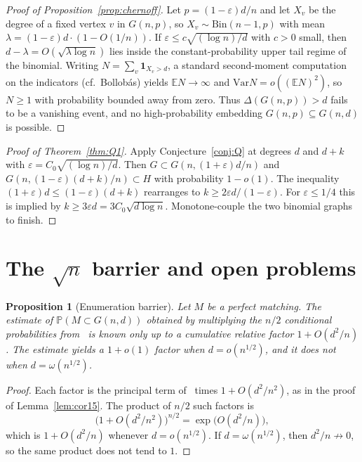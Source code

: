 \documentclass[11pt]{article}
\newtheorem{proposition}[theorem]{Proposition}
\newcommand{\Gnd}{G(n,d)}
\newcommand{\EE}{\mathbb{E}}
\newcommand{\PP}{\mathbb{P}}
\newcommand{\Var}{\mathrm{Var}}
\begin{document}
\begin{proof}[Proof of Proposition~\ref{prop:chernoff}]
Let \(p=(1-\varepsilon)d/n\) and let \(X_v\) be the degree of a fixed vertex \(v\) in
\(G(n,p)\), so \(X_v\sim\mathrm{Bin}(n-1,p)\) with mean
\(\lambda=(1-\varepsilon)d\cdot(1-O(1/n))\).
If \(\varepsilon\le c\sqrt{(\log n)/d}\) with \(c>0\) small, then
\(d-\lambda=O(\sqrt{\lambda\log n})\) lies inside the constant-probability upper
tail regime of the binomial.
Writing \(N=\sum_v\mathbf{1}_{X_v>d}\), a standard second-moment computation on the
indicators (cf.\ Bollob\'as) yields \(\EE N\to\infty\) and
\(\Var N=o((\EE N)^2)\), so \(N\ge 1\) with probability bounded away from zero.
Thus \(\Delta(G(n,p))>d\) fails to be a vanishing event, and no high-probability
embedding \(G(n,p)\subseteq\Gnd\) is possible.
\end{proof}

\begin{proof}[Proof of Theorem~\ref{thm:Q1}]
Apply Conjecture~\ref{conj:Q} at degrees \(d\) and \(d+k\) with
\(\varepsilon=C_0\sqrt{(\log n)/d}\).
Then \(G\subset G(n,(1+\varepsilon)d/n)\) and
\(G(n,(1-\varepsilon)(d+k)/n)\subset H\) with probability \(1-o(1)\).
The inequality \((1+\varepsilon)d\le(1-\varepsilon)(d+k)\) rearranges to
\(k\ge 2\varepsilon d/(1-\varepsilon)\).
For \(\varepsilon\le 1/4\) this is implied by \(k\ge 3\varepsilon d=3C_0\sqrt{d\log n}\).
Monotone-couple the two binomial graphs to finish.
\end{proof}

\section{The \texorpdfstring{\(\sqrt{n}\)}{sqrt(n)} barrier and open problems}
\label{sec:open}

\begin{proposition}[Enumeration barrier]
\label{prop:barrier}
Let \(M\) be a perfect matching. The estimate of \(\PP(M\subset\Gnd)\) obtained by
multiplying the \(n/2\) conditional probabilities from~\cite[Theorem~6]{Gao20} is
known only up to a cumulative relative factor \(1+O(d^2/n)\). The estimate yields a
\(1+o(1)\) factor when \(d=o(n^{1/2})\), and it does not when \(d=\omega(n^{1/2})\).
\end{proposition}

\begin{proof}
Each factor is the principal term of~\cite[Theorem~6]{Gao20} times \(1+O(d^2/n^2)\),
as in the proof of Lemma~\ref{lem:cor15}. The product of \(n/2\) such factors is
\[
\bigl(1+O(d^2/n^2)\bigr)^{n/2}
=
\exp\bigl(O(d^2/n)\bigr),
\]
which is \(1+O(d^2/n)\) whenever \(d=o(n^{1/2})\). If \(d=\omega(n^{1/2})\), then \(d^2/n\not\to 0\),
so the same product does not tend to \(1\).
\end{proof}
\end{document}
